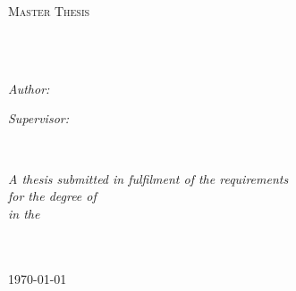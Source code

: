 \documentclass[
11pt, %
english, %
singlespacing, %
headsepline, %
]{MastersDoctoralThesis} %
\author{Luiza Adelina \textsc{Ciucu}} %
\begin{document}
\frontmatter %

\pagestyle{plain} %


\begin{titlepage}
\begin{center}

\vspace*{.06\textheight}
{\scshape\LARGE \univname\par}\vspace{1.5cm} %
\textsc{\Large Master Thesis}\\[0.5cm] %

\HRule \\[0.4cm] %
{\huge \bfseries \ttitle\par}\vspace{0.4cm} %
\HRule \\[1.5cm] %
 
\begin{minipage}[t]{0.4\textwidth}
\begin{flushleft} \large
\emph{Author:}\\
\href{http://www.johnsmith.com}{\authorname} %
\end{flushleft}
\end{minipage}
\begin{minipage}[t]{0.4\textwidth}
\begin{flushright} \large
\emph{Supervisor:} \\
\href{http://www.jamessmith.com}{\supname} %
\end{flushright}
\end{minipage}\\[3cm]
 
\vfill

\large \textit{A thesis submitted in fulfilment of the requirements\\ for the degree of \degreename}\\[0.3cm] %
\textit{in the}\\[0.4cm]
\groupname\\\deptname\\[2cm] %
 
\vfill

{\large \today}\\[4cm] %
 
\vfill
\end{center}
\end{titlepage}
\end{document}
